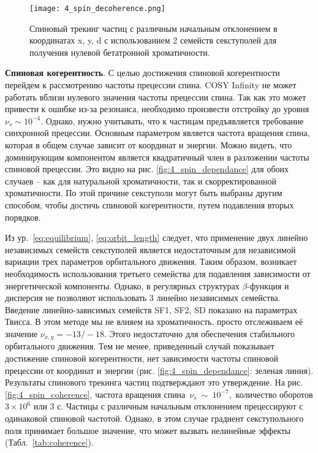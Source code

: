 \begin{figure}[!h]
  \centering
   \texttt{[image: 4\_spin\_decoherence.png]}
   \caption{Спиновый трекинг частиц с различным начальным отклонением в координатах x, y, d с использованием 2 семейств секступолей для получения нулевой бетатронной хроматичности.}
   \label{fig:4_spin_decoherence}
\end{figure}

\textbf{Спиновая когерентность}. С целью достижения спиновой когерентности перейдем к рассмотрению частоты прецессии спина. COSY Infinity \cite{cosy} не может работать вблизи нулевого значения частоты прецессии спина. Так как это может привести к ошибке из-за резонанса, необходимо произвести отстройку до уровня $\nu_s\sim{10}^{-4}$. Однако, нужно учитывать, что к частицам предъявляется требование синхронной прецессии. Основным параметром является частота вращения спина, которая в общем случае зависит от координат и энергии. Можно видеть, что доминирующим компонентом является квадратичный член в разложении частоты спиновой прецессии. Это видно на рис. \ref{fig:4_spin_dependance} для обоих случаев – как для натуральной хроматичности, так и скорректированной хроматичности. По этой причине секступоли могут быть выбраны другим способом, чтобы достичь спиновой когерентности, путем подавления вторых порядков.

\par Из ур.~\ref{eq:equilibrium}, \ref{eq:orbit_length} следует, что применение двух линейно независимых семейств секступолей является недостаточным для независимой вариации трех параметров орбитального движения. Таким образом, возникает необходимость использования третьего семейства для подавления зависимости от энергетической компоненты. Однако, в регулярных структурах $\beta$-функция и дисперсия не позволяют использовать 3 линейно независимых семейства. Введение линейно-зависимых семейств SF1, SF2, SD показано на параметрах Твисса. В этом методе мы не влияем на хроматичность, просто отслеживаем её значение $\nu_{x,y}=-13/-18$. Этого недостаточно для обеспечения стабильного орбитального движения. Тем не менее, приведенный случай показывает достижение спиновой когерентности, нет зависимости частоты спиновой прецессии от координат и энергии (рис. \ref{fig:4_spin_dependance}: зеленая линия). Результаты спинового трекинга частиц подтверждают это утверждение. На рис. \ref{fig:4_spin_coherence}, частота вращения спина~$\nu_s~\sim~{10}^{-7}$,~количество оборотов $3\times{10}^6$ или $3$ с. Частицы с различным начальным отклонением прецессируют с одинаковой спиновой частотой. Однако, в этом случае градиент секступольного поля принимает большое значение, что может вызвать нелинейные эффекты (Табл.~\ref{tab:coherence}).

